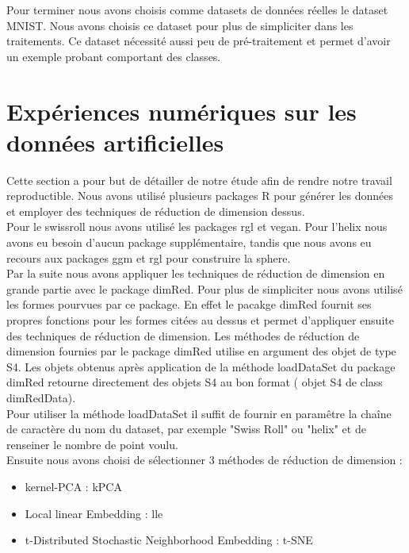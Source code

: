 \documentclass{article}
\begin{document}
\begin{multicols}{2}
Pour terminer nous avons choisis comme datasets de données réelles le dataset MNIST\cite{MNIST}. Nous avons choisis ce dataset pour plus de simpliciter dans les traitements. Ce dataset nécessité aussi peu de pré-traitement et permet d'avoir un exemple probant comportant des classes.\\

\section{Expériences numériques sur les 
données artificielles }
Cette section a pour but de détailler de notre étude afin de rendre notre travail reproductible.
Nous avons utilisé plusieurs packages R pour générer les données et employer des techniques de réduction de dimension dessus.\\

Pour le swissroll nous avons utilisé les packages rgl et vegan.
Pour l'helix nous avons eu besoin d'aucun package supplémentaire, tandis que nous avons eu recours aux packages ggm et rgl pour construire la sphere.\\ 

Par la suite nous avons appliquer les techniques de réduction de dimension en grande partie avec le package dimRed. Pour plus de simpliciter nous avons utilisé les formes pourvues par ce package. En effet le pacakge dimRed fournit ses propres fonctions pour les formes citées au dessus et permet d'appliquer ensuite des techniques de réduction de dimension. Les méthodes de réduction de dimension fournies par le package dimRed utilise en argument des objet de type S4. Les objets obtenus après application de la méthode loadDataSet du package dimRed retourne directement des objets S4 au bon format ( objet S4 de class dimRedData).\\

Pour utiliser la méthode loadDataSet il suffit de fournir en paramêtre la chaîne de caractère du nom du dataset, par exemple "Swiss Roll" ou "helix" et de renseiner le nombre de point voulu. \\

Ensuite nous avons choisi de sélectionner 3 méthodes de réduction de dimension : 
\begin{itemize}
    \item kernel-PCA : kPCA
    \item Local linear Embedding : lle
    \item t-Distributed Stochastic Neighborhood Embedding : t-SNE
\end{itemize}


\end{multicols}
\end{document}
